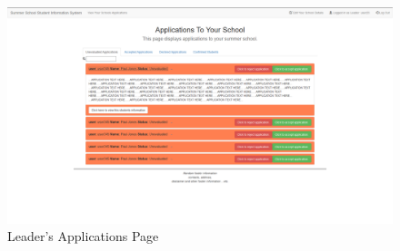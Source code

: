 \documentclass{project}
\begin{document}
\begin{figure}[H]
\includegraphics[width=\linewidth]{leader-app2.png}
\caption{Leader's Applications Page}
\label{fig:leaders-applications2}
\end{figure}
\clearpage
\end{document}
